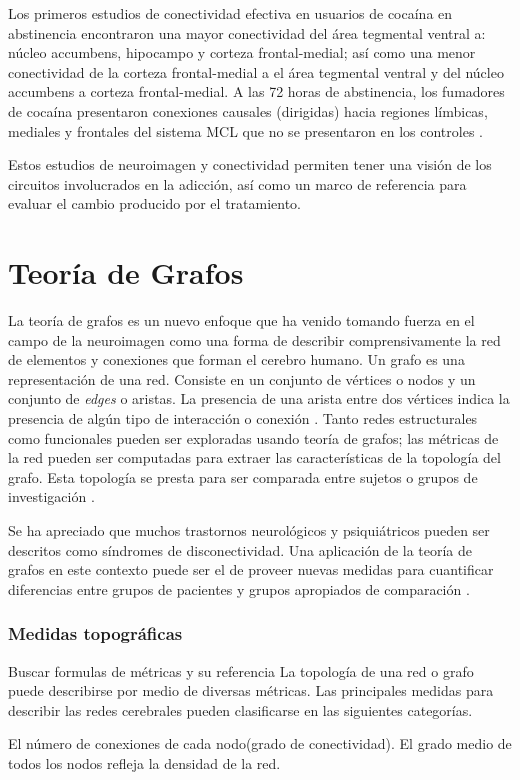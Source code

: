 Los primeros estudios de conectividad efectiva en usuarios de cocaína en abstinencia encontraron una mayor conectividad del área tegmental ventral a: núcleo accumbens, hipocampo y corteza frontal-medial; así como una menor conectividad de la corteza frontal-medial a el área tegmental ventral y del núcleo accumbens a corteza frontal-medial.
A las 72 horas de abstinencia, los fumadores de cocaína presentaron conexiones causales (dirigidas) hacia regiones límbicas, mediales y frontales del sistema MCL que no se presentaron en los controles \parencite{Ray2017,Ray2016}.\par
Estos estudios de neuroimagen y conectividad permiten tener una visión de los circuitos involucrados en la adicción, así como un marco de referencia para evaluar el cambio producido por el tratamiento.

\section{Teoría de Grafos}
La teoría de grafos es un nuevo enfoque que ha venido tomando fuerza en el campo de la neuroimagen como una forma de describir comprensivamente la red de elementos y conexiones que forman el cerebro humano.
Un grafo es una representación de una red. Consiste en un conjunto de vértices o nodos y un conjunto de \textit{edges} o aristas. La presencia de una arista entre dos vértices indica la presencia de algún tipo de interacción o conexión \parencite{Stam2007}.
Tanto redes estructurales como funcionales pueden ser exploradas usando teoría de grafos; las métricas de la red pueden ser computadas para extraer las características de la topología del grafo.
Esta topología se presta para ser comparada entre sujetos o grupos de investigación \parencite{Bullmore2009a,Sporns2011}.\par
Se ha apreciado que muchos trastornos neurológicos y psiquiátricos pueden ser descritos como síndromes de disconectividad.
Una aplicación de la teoría de grafos en este contexto puede ser el de proveer nuevas medidas para cuantificar diferencias entre grupos de pacientes y grupos apropiados de comparación \parencite{Bullmore2009a}.

\subsubsection{Medidas topográficas}
Buscar formulas de métricas y su referencia
La topología de una red o grafo puede describirse por medio de diversas métricas. Las principales medidas para describir las redes cerebrales pueden clasificarse en las siguientes categorías.\par
\theoremstyle{definition}
\newtheorem*{def1}{Costo}
\newtheorem*{def2}{Segregación}
\newtheorem*{def3}{Integración}
\newtheorem*{def4}{Pequeño Mundo}
El número de conexiones de cada nodo(grado de conectividad). El grado medio de todos los nodos refleja la densidad de la red.
